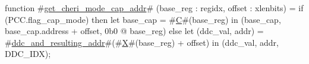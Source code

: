 function #\hyperref[sailRISCVzgetzycherizymodezycapzyaddr]{get\_cheri\_mode\_cap\_addr}# (base_reg : regidx, offset : xlenbits) = {
  if (PCC.flag_cap_mode) then
    let base_cap = #\hyperref[sailRISCVzC]{C}#(base_reg) in
    (base_cap, base_cap.address + offset, 0b0 @ base_reg)
  else
    let (ddc_val, addr) = #\hyperref[sailRISCVzddczyandzyresultingzyaddr]{ddc\_and\_resulting\_addr}#(#\hyperref[sailRISCVzX]{X}#(base_reg) + offset) in
    (ddc_val, addr, DDC_IDX);
}
